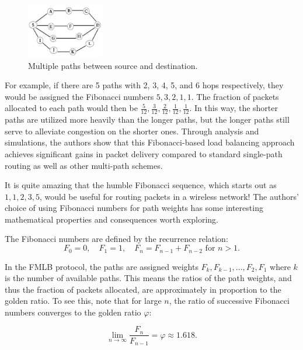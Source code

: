 \documentclass[12pt]{article}
\begin{document}
\begin{figure}[ht]
  \centering
  \includegraphics[width=0.3\textwidth]{./images/Multiple-paths-between-source-and-destination.png}
  \caption{Multiple paths between source and destination.}
  \label{fig:multiple_paths_map}
  \end{figure}

For example, if there are 5 paths with 2, 3, 4, 5, and 6 hops respectively, they would be assigned the Fibonacci numbers $5, 3, 2, 1, 1$. The fraction of packets allocated to each path would then be $\frac{5}{12}, \frac{3}{12}, \frac{2}{12}, \frac{1}{12}, \frac{1}{12}$. In this way, the shorter paths are utilized more heavily than the longer paths, but the longer paths still serve to alleviate congestion on the shorter ones. Through analysis and simulations, the authors show that this Fibonacci-based load balancing approach achieves significant gains in packet delivery compared to standard single-path routing as well as other multi-path schemes.

It is quite amazing that the humble Fibonacci sequence, which starts out as $1, 1, 2, 3, 5$, would be useful for routing packets in a wireless network! The authors' choice of using Fibonacci numbers for path weights has some interesting mathematical properties and consequences worth exploring.

The Fibonacci numbers are defined by the recurrence relation:
\begin{equation}
F_0 = 0, \quad F_1 = 1, \quad F_n = F_{n-1} + F_{n-2} \text{ for } n > 1.
\end{equation}

In the FMLB protocol, the paths are assigned weights $F_k, F_{k-1}, \ldots, F_2, F_1$ where $k$ is the number of available paths. This means the ratios of the path weights, and thus the fraction of packets allocated, are approximately in proportion to the golden ratio. To see this, note that for large $n$, the ratio of successive Fibonacci numbers converges to the golden ratio $\varphi$:

\begin{equation}
\lim_{n \to \infty} \frac{F_n}{F_{n-1}} = \varphi \approx 1.618.
\end{equation}
\end{document}
